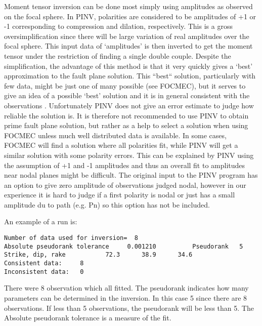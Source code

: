 Moment tensor inversion can be done most simply using amplitudes as observed on the focal sphere. In PINV, polarities are considered to be amplitudes of +1 or -1 corresponding to compression and dilation, respectively. This is a gross oversimplification since there will be large variation of real amplitudes over the focal sphere. This input data of ‘amplitudes’ is then inverted to get the moment tensor under the restriction of finding a single double couple. Despite the simplification, the advantage of this method is that it very quickly gives a ‘best’ approximation to the fault plane solution. This “best“ solution, particularly with few data, might be just one of many possible (see FOCMEC), but it serves to give an idea of a possible ‘best’ solution and it is in general consistent with the observations \citep{suetsugu1998}.  Unfortunately PINV does not give an error estimate to judge how reliable the solution is. It is therefore not recommended to use PINV to obtain prime fault plane solution, but rather as a help to select a solution when using FOCMEC unless much well distributed data is available.
In some cases, FOCMEC will find a solution where all polarities fit, while PINV will get a similar solution with some polarity errors. This can be explained by PINV using the assumption of  +1 and -1 amplitudes and thus an overall fit to amplitudes near nodal planes might be difficult. The original  input  to the PINV program has an option to give zero amplitude of observations judged nodal, however in our experience it is hard to judge if a first polarity is nodal or just has a small amplitude du to path (e.g. Pn) so this option has not be included.  

An example of a run is:

\begin{verbatim}
Number of data used for inversion=  8
Absolute pseudorank tolerance     0.001210          Pseudorank   5
Strike, dip, rake           72.3      38.9      34.6
Consistent data:     8
Inconsistent data:   0
\end{verbatim}

There were 8 observation which all fitted. The pseudorank indicates how many parameters can be determined in the inversion. In this case 5 since there are 8 observations. If less than 5 observations, the pseudorank will be less than 5.  The Absolute pseudorank tolerance  is a measure of the fit.

